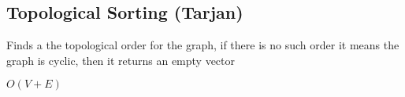 \subsection{Topological Sorting (Tarjan)}

Finds a the topological order for the graph, if there is no such order it means the graph is cyclic, then it returns an empty vector

$O(V + E)$
